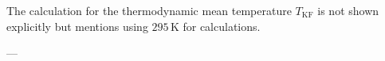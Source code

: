 The calculation for the thermodynamic mean temperature \( T_{\text{KF}} \) is not shown explicitly but mentions using \( 295 \, \text{K} \) for calculations.  

---